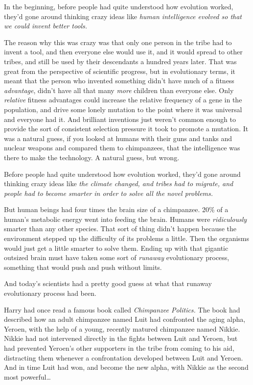 In the beginning, before people had quite understood how evolution worked,
they'd gone around thinking crazy ideas like \emph{human intelligence evolved
so that we could invent better tools.}

The reason why this was crazy was that only one person in the tribe had to
invent a tool, and then everyone else would use it, and it would spread to
other tribes, and still be used by their descendants a hundred years later.
That was great from the perspective of scientific progress, but in evolutionary
terms, it meant that the person who invented something didn't have much of a
fitness \emph{advantage}, didn't have all that many \emph{more} children than
everyone else. Only \emph{relative} fitness advantages could increase the
relative frequency of a gene in the population, and drive some lonely mutation
to the point where it was universal and everyone had it. And brilliant
inventions just weren't common enough to provide the sort of consistent
selection pressure it took to promote a mutation. It was a natural guess, if
you looked at humans with their guns and tanks and nuclear weapons and compared
them to chimpanzees, that the intelligence was there to make the technology. A
natural guess, but wrong.

Before people had quite understood how evolution worked, they'd gone around
thinking crazy ideas like \emph{the climate changed, and tribes had to migrate,
and people had to become smarter in order to solve all the novel problems.}

But human beings had four times the brain size of a chimpanzee. 20\% of a
human's metabolic energy went into feeding the brain. Humans were
\emph{ridiculously} smarter than any other species. That sort of thing didn't
happen because the environment stepped up the difficulty of its problems a
little. Then the organisms would just get a little smarter to solve them.
Ending up with that gigantic outsized brain must have taken some sort of
\emph{runaway} evolutionary process, something that would push and push without
limits.

And today's scientists had a pretty good guess at what that runaway
evolutionary process had been.

Harry had once read a famous book called \emph{Chimpanzee Politics.} The book
had described how an adult chimpanzee named Luit had confronted the aging
alpha, Yeroen, with the help of a young, recently matured chimpanzee named
Nikkie. Nikkie had not intervened directly in the fights between Luit and
Yeroen, but had prevented Yeroen's other supporters in the tribe from coming to
his aid, distracting them whenever a confrontation developed between Luit and
Yeroen. And in time Luit had won, and become the new alpha, with Nikkie as the
second most powerful{\ldots}

